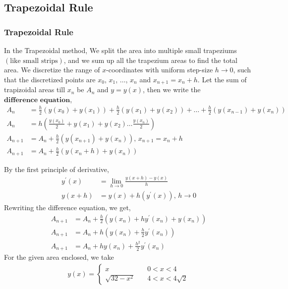 \documentclass{beamer}
\providecommand{\brak}[1]{\ensuremath{\left(#1\right)}}
\theoremstyle{remark}
\numberwithin{equation}{section}
\begin{document}
\subsection{Trapezoidal Rule}
\begin{frame}
\frametitle{Trapezoidal Rule}
\newline
In the Trapezoidal method, We split the area into multiple small trapeziums \brak{\text{like small strips}}, and we sum up all the trapezium areas to find the total area. 
\newline
We discretize the range of $x$-coordinates with uniform step-size $h \to 0$, such that the discretized points are $x_0$, $x_1$, $\dots$, $x_n$ and $x_{n + 1} = x_n + h$.
\newline
Let the sum of trapizoidal areas till $x_n$ be $A_n$ and $y = y\brak{x}$, then we write the $\textbf{difference equation}$,
\begin{align}
    A_n &= \frac{h}{2}\brak{y\brak{x_0} + y\brak{x_1}} + \frac{h}{2}\brak{y\brak{x_1} + y\brak{x_2}} + \dots + \frac{h}{2}\brak{y\brak{x_{n - 1}} + y\brak{x_{n}}}\\
    A_n &= h\brak{\frac{y\brak{x_0}}{2} + y\brak{x_1} + y\brak{x_2} \dots \frac{y\brak{x_n}}{2}}\\
    A_{n + 1} &= A_n + \frac{h}{2}\brak{y\brak{x_{n + 1}} + y\brak{x_n}} \text{, } x_{n + 1} = x_n + h\\
    A_{n + 1} &= A_n + \frac{h}{2}\brak{y\brak{x_n + h} + y\brak{x_n}}
\end{align}
\end{frame}
\begin{frame}
By the first principle of derivative,
\begin{align}
    y^{\prime}\brak{x} &= \lim_{h\to0} \frac{y\brak{x + h} - y\brak{x}}{h}\\
    y\brak{x + h} &= y\brak{x} + h\brak{y^{\prime}\brak{x}} \text{, } h\to0
\end{align}
Rewriting the difference equation, we get,
\begin{align}
    A_{n + 1} &= A_n + \frac{h}{2}\brak{y\brak{x_n} + hy^{\prime}\brak{x_n} + y\brak{x_n}}\\
    A_{n + 1} &= A_n + h\brak{y\brak{x_n} + \frac{h}{2}y^{\prime}\brak{x_n}}\\
    A_{n + 1} &= A_n + hy\brak{x_n} + \frac{h^2}{2}y^{\prime}\brak{x_n}
\end{align}
For the given area enclosed, we take
\begin{align}
    y\brak{x} =
    \begin{cases}
        x & \quad 0 < x < 4\\
	    \sqrt{32 - x^2} & \quad 4 < x < 4\sqrt{2}
    \end{cases}
\end{align}
\end{frame}
\end{document}
